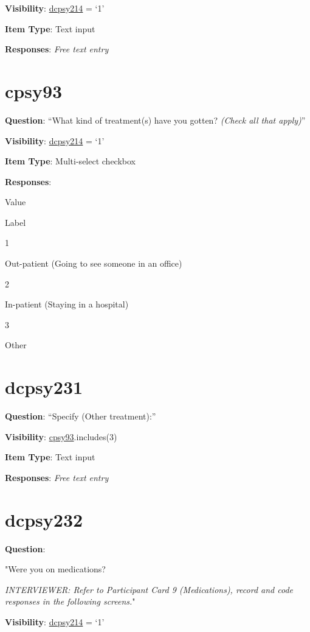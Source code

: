 \documentclass[]{book}
\begin{document}
\textbf{Visibility}: \protect\hyperlink{dcpsy214}{dcpsy214} = `1'

\textbf{Item Type}: Text input

\textbf{Responses}: \emph{Free text entry}

\hypertarget{cpsy93}{%
\section{cpsy93}\label{cpsy93}}

\textbf{Question}: ``What kind of treatment(s) have you gotten? \emph{(Check all that apply)}''

\textbf{Visibility}: \protect\hyperlink{dcpsy214}{dcpsy214} = `1'

\textbf{Item Type}: Multi-select checkbox

\textbf{Responses}:

Value

Label

1

Out-patient (Going to see someone in an office)

2

In-patient (Staying in a hospital)

3

Other

\hypertarget{dcpsy231}{%
\section{dcpsy231}\label{dcpsy231}}

\textbf{Question}: ``Specify (Other treatment):''

\textbf{Visibility}: \protect\hyperlink{cpsy93}{cpsy93}.includes(3)

\textbf{Item Type}: Text input

\textbf{Responses}: \emph{Free text entry}

\hypertarget{dcpsy232}{%
\section{dcpsy232}\label{dcpsy232}}

\textbf{Question}:

"Were you on medications?

\emph{INTERVIEWER: Refer to Participant Card 9 (Medications), record and code responses in the following screens.}"

\textbf{Visibility}: \protect\hyperlink{dcpsy214}{dcpsy214} = `1'
\end{document}
